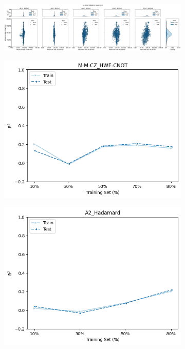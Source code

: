 \documentclass[journal=jacsat,manuscript=article]{achemso}
\begin{document}
\begin{figure}[H]
	\hfill
	\begin{subfigure}[b]{0.49\textwidth}
		\centering
		\includegraphics[width=\linewidth]{../images/BSE/sixteenqubit/distribution_parity}
		\caption{}
		\label{fig:BSE16_distribution_parity}
	\end{subfigure}
	\caption{}
	\label{fig:BSE_distribution_parity}	
\end{figure}



\begin{figure}[H]
	\centering	
	\begin{subfigure}[b]{0.49\textwidth}
		\centering
		\includegraphics[width=\linewidth]{../images/BSE/fivequbit/BSE_learningcurve}
		\caption{}
		\label{fig:BSE5_learning_curves}
	\end{subfigure}
	\hfill
	\begin{subfigure}[b]{0.49\textwidth}
		\centering
		\includegraphics[width=\linewidth]{../images/BSE/sixteenqubit/BSE_learningcurve}

\end{subfigure}
\end{figure}
\end{document}
